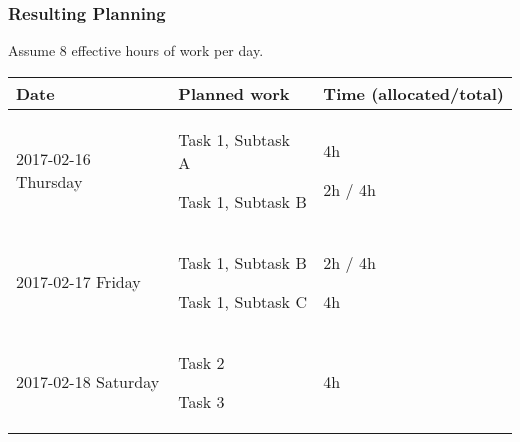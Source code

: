 \subsubsection{Resulting Planning}\label{resulting-planning}
Assume 8 effective hours of work per day.

\begin{longtable}[c]{@{}lll@{}}
\toprule
\begin{minipage}[b]{0.28\columnwidth}\raggedright\strut
Date
\strut\end{minipage} &
\begin{minipage}[b]{0.25\columnwidth}\raggedright\strut
Planned work
\strut\end{minipage} &
\begin{minipage}[b]{0.32\columnwidth}\raggedright\strut
Time (allocated/total)
\strut\end{minipage}\tabularnewline
\midrule
\endhead
\begin{minipage}[t]{0.28\columnwidth}\raggedright\strut
2017-02-16 Thursday
\strut\end{minipage} &
\begin{minipage}[t]{0.25\columnwidth}\raggedright\strut
Task 1, Subtask A

Task 1, Subtask B
\strut\end{minipage} &
\begin{minipage}[t]{0.32\columnwidth}\raggedright\strut
4h

2h / 4h
\strut\end{minipage}\tabularnewline
\begin{minipage}[t]{0.28\columnwidth}\raggedright\strut
2017-02-17 Friday
\strut\end{minipage} &
\begin{minipage}[t]{0.25\columnwidth}\raggedright\strut
Task 1, Subtask B

Task 1, Subtask C
\strut\end{minipage} &
\begin{minipage}[t]{0.32\columnwidth}\raggedright\strut
2h / 4h

4h
\strut\end{minipage}\tabularnewline
\begin{minipage}[t]{0.28\columnwidth}\raggedright\strut
2017-02-18 Saturday
\strut\end{minipage} &
\begin{minipage}[t]{0.25\columnwidth}\raggedright\strut
Task 2

Task 3
\strut\end{minipage} &
\begin{minipage}[t]{0.32\columnwidth}\raggedright\strut
4h


\end{minipage}
\end{longtable}
